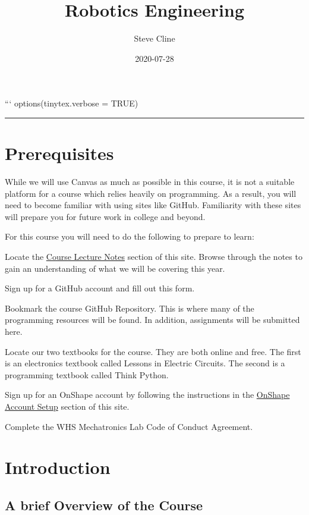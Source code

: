 \documentclass[
]{book}
\title{Robotics Engineering}
\author{Steve Cline}
\date{2020-07-28}
\begin{document}
\maketitle

{
\setcounter{tocdepth}{1}
\tableofcontents
}
```
options(tinytex.verbose = TRUE)

\begin{center}\rule{0.5\linewidth}{0.5pt}\end{center}

\hypertarget{prerequisites}{%
\chapter{Prerequisites}\label{prerequisites}}

While we will use Canvas as much as possible in this course, it is not a suitable platform for a course which relies heavily on programming. As a result, you will need to become familiar with using sites like GitHub. Familiarity with these sites will prepare you for future work in college and beyond.

For this course you will need to do the following to prepare to learn:

Locate the \protect\hyperlink{course-lecture-notes}{Course Lecture Notes} section of this site. Browse through the notes to gain an understanding of what we will be covering this year.

Sign up for a GitHub account and fill out this form.

Bookmark the course GitHub Repository. This is where many of the programming resources will be found. In addition, assignments will be submitted here.

Locate our two textbooks for the course. They are both online and free. The first is an electronics textbook called Lessons in Electric Circuits. The second is a programming textbook called Think Python.

Sign up for an OnShape account by following the instructions in the \protect\hyperlink{onshape-account-setup}{OnShape Account Setup} section of this site.

Complete the WHS Mechatronics Lab Code of Conduct Agreement.

\hypertarget{intro}{%
\chapter{Introduction}\label{intro}}

\hypertarget{a-brief-overview-of-the-course}{%
\section{A brief Overview of the Course}\label{a-brief-overview-of-the-course}}
\end{document}
